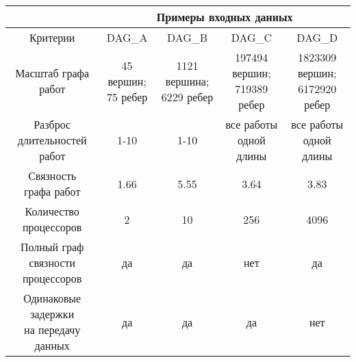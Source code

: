\begin{table}[!htbp]

    \begin{tabular}{c|c|c|c|c}
                            & \multicolumn{4}{c}{Примеры входных данных}                            \\
        \hline
        Критерии            & DAG\_A                                     & DAG\_B & DAG\_C & DAG\_D \\
        \hline
        Масштаб графа работ & \makecell{45 вершин;                                                  \\75 ребер}                        & \makecell{1121 вершина;\\6229 ребер} & \makecell{197494 вершин;\\719389 ребер} & \makecell{1823309 вершин;\\6172920 ребер} \\
        \hline
        \makecell{Разброс                                                                           \\длительностей работ}            & 1-10                                       & 1-10   & \makecell{все работы\\одной длины} & \makecell{все работы\\одной длины} \\
        \hline
        \makecell{Связность                                                                         \\графа работ}                  & 1.66                                       & 5.55   & 3.64                   & 3.83                   \\
        \hline
        \makecell{Количество                                                                        \\процессоров}                 & 2                                          & 10     & 256                    & 4096                   \\
        \hline
        \makecell{Полный граф                                                                       \\связности\\процессоров}      & да                                         & да     & нет                    & да                     \\
        \hline
        \makecell{Одинаковые задержки                                                               \\на передачу данных} & да                                         & да     & да                     & нет                    \\
    \end{tabular}

\end{table}
